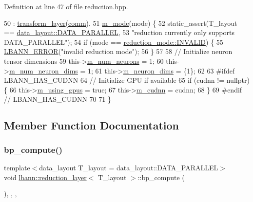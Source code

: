 Definition at line 47 of file reduction.\+hpp.


\begin{DoxyCode}
50     : \hyperlink{classlbann_1_1transform__layer_a4b72501e0f4d0745c8b13c5331055e65}{transform\_layer}(\hyperlink{file__io_8cpp_ab048c6f9fcbcfaa57ce68b00263dbebe}{comm}),
51       \hyperlink{classlbann_1_1reduction__layer_aa8c753154fec05a00ede9217df3ba638}{m\_mode}(mode) \{
52     static\_assert(T\_layout == \hyperlink{base_8hpp_a786677cbfb3f5677b4d84f3056eb08dba37d2a3465f7cbf4ab60f4e79944d0638}{data\_layout::DATA\_PARALLEL},
53                   \textcolor{stringliteral}{"reduction currently only supports DATA\_PARALLEL"});
54     \textcolor{keywordflow}{if} (mode == \hyperlink{namespacelbann_a5975e1fb530a267728bfb01dc5c1be9baccc0377a8afbf50e7094f5c23a8af223}{reduction\_mode::INVALID}) \{
55       \hyperlink{base_8hpp_a80b1d707117e968a6951b7222e4b2b87}{LBANN\_ERROR}(\textcolor{stringliteral}{"invalid reduction mode"});
56     \}
57     
58     \textcolor{comment}{// Initialize neuron tensor dimensions}
59     this->\hyperlink{classlbann_1_1Layer_a6b5ebc8a7d9329d8a773ed787e7b41d8}{m\_num\_neurons} = 1;
60     this->\hyperlink{classlbann_1_1Layer_adfd6178d21498c9095cd947ae1eb2d6a}{m\_num\_neuron\_dims} = 1;
61     this->\hyperlink{classlbann_1_1Layer_abb34bb8031f57a483e2e327a5f229f48}{m\_neuron\_dims} = \{1\};
62 
63 \textcolor{preprocessor}{  #ifdef LBANN\_HAS\_CUDNN}
64     \textcolor{comment}{// Initialize GPU if available}
65     \textcolor{keywordflow}{if} (cudnn != \textcolor{keyword}{nullptr}) \{
66       this->\hyperlink{classlbann_1_1Layer_af7881cb5eff5207c15fa835d65462e8f}{m\_using\_gpus} = \textcolor{keyword}{true};
67       this->\hyperlink{classlbann_1_1Layer_a08dbb94239e3b8c96329786c57c72e21}{m\_cudnn} = cudnn;
68     \}
69 \textcolor{preprocessor}{  #endif // LBANN\_HAS\_CUDNN}
70 
71   \}
\end{DoxyCode}


\subsection{Member Function Documentation}
\mbox{\label{classlbann_1_1reduction__layer_a2ea767accbf2c9fdc9074d1e473db259}} 
\subsubsection{\texorpdfstring{bp\+\_\+compute()}{bp\_compute()}}
{\footnotesize\ttfamily template$<$data\+\_\+layout T\+\_\+layout = data\+\_\+layout\+::\+D\+A\+T\+A\+\_\+\+P\+A\+R\+A\+L\+L\+EL$>$ \\
void \hyperlink{classlbann_1_1reduction__layer}{lbann\+::reduction\+\_\+layer}$<$ T\+\_\+layout $>$\+::bp\+\_\+compute (\begin{DoxyParamCaption}{ }\end{DoxyParamCaption})\hspace{0.3cm}{\ttfamily [inline]}, {\ttfamily [override]}, {\ttfamily [protected]}, {\ttfamily [virtual]}}

